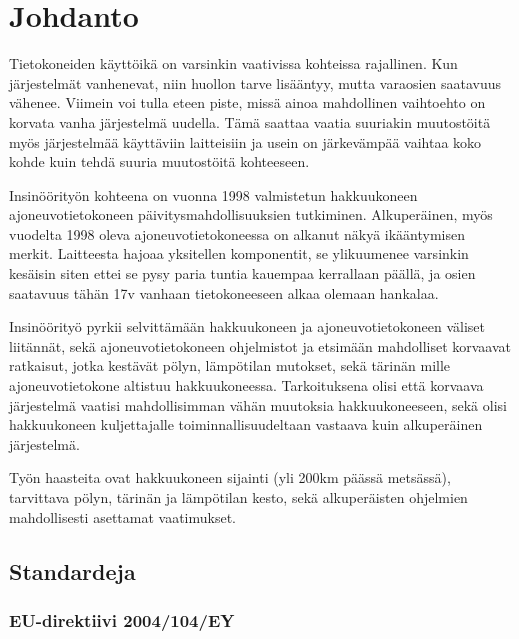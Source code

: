 \documentclass[11pt,a4paper,oneside,article]{memoir}
\begin{document}
\setcounter{page}{1} %
\ClearWallPaper

\chapter{Johdanto}

Tietokoneiden käyttöikä on varsinkin vaativissa kohteissa rajallinen. Kun järjestelmät vanhenevat, niin huollon tarve lisääntyy, mutta varaosien saatavuus vähenee. Viimein voi tulla eteen piste, missä ainoa mahdollinen vaihtoehto on korvata vanha järjestelmä uudella. Tämä saattaa vaatia suuriakin muutostöitä myös järjestelmää käyttäviin laitteisiin ja usein on järkevämpää vaihtaa koko kohde kuin tehdä suuria muutostöitä kohteeseen.

Insinöörityön kohteena on vuonna 1998 valmistetun hakkuukoneen ajoneuvotietokoneen päivitysmahdollisuuksien tutkiminen. Alkuperäinen, myös vuodelta 1998 oleva ajoneuvotietokoneessa on alkanut näkyä ikääntymisen merkit. Laitteesta hajoaa yksitellen komponentit, se ylikuumenee varsinkin kesäisin siten ettei se pysy paria tuntia kauempaa kerrallaan päällä, ja osien saatavuus tähän 17v vanhaan tietokoneeseen alkaa olemaan hankalaa.

Insinöörityö pyrkii selvittämään hakkuukoneen ja ajoneuvotietokoneen väliset liitännät, sekä ajoneuvotietokoneen ohjelmistot ja etsimään mahdolliset korvaavat ratkaisut, jotka kestävät pölyn, lämpötilan mutokset, sekä tärinän mille ajoneuvotietokone altistuu hakkuukoneessa. Tarkoituksena olisi että korvaava järjestelmä vaatisi mahdollisimman vähän muutoksia hakkuukoneeseen, sekä olisi hakkuukoneen kuljettajalle toiminnallisuudeltaan vastaava kuin alkuperäinen järjestelmä.

Työn haasteita ovat hakkuukoneen sijainti (yli 200km päässä metsässä), tarvittava pölyn, tärinän ja lämpötilan kesto, sekä alkuperäisten ohjelmien mahdollisesti asettamat vaatimukset.

\section{Standardeja}

\subsection{EU-direktiivi 2004/104/EY}
\end{document}
